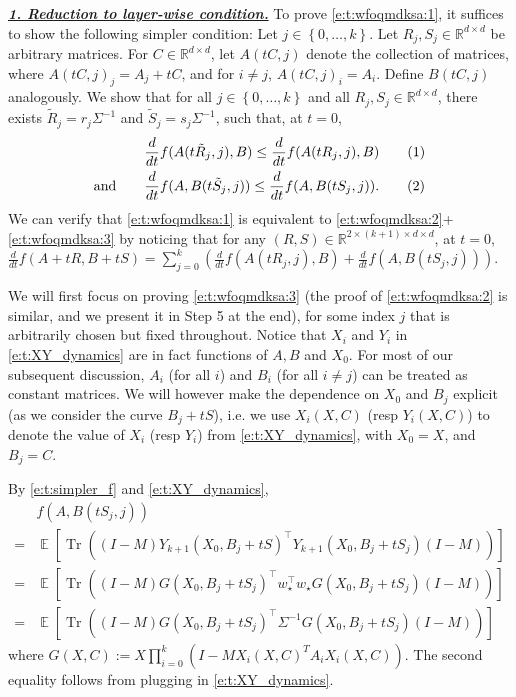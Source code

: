 \documentclass{article}
\DeclareMathOperator{\E}{\mathbb{E}}
\newcommand{\R}{\mathbb{R}}
\newcommand{\wstar}{w_\star}
\newcommand{\emphh}[1]{\textbf{\emph{#1}}}
\DeclareMathOperator{\tr}{Tr}
\newcommand*\lrb[1]{\left[ #1 \right]}
\newcommand*\lrp[1]{\left( #1 \right)}
\newcommand*\lrbb[1]{\left\{ #1 \right\}}
\newcommand\numberthis{\addtocounter{equation}{1}\tag{\theequation}}
\begin{document}
\underline{\emphh{1. Reduction to layer-wise condition.}}
To prove \eqref{e:t:wfoqmdksa:1}, it suffices to show the following simpler condition: Let $j\in \lrbb{0,\dots,k}$. Let $R_j, S_j \in \R^{d\times d}$ be arbitrary matrices. For $C\in \R^{d \times d}$, let $A(t C, j)$ denote the collection of matrices, where $A(t C, j)_j = A_j + t C$, and for $i\neq j$, $A(t C, j)_i = A_i$. Define $B(t C,j)$ analogously. We show that for all $j\in \lrbb{0,\dots,k}$ and all $R_j,S_j\in \R^{d\times d}$, there exists $\tilde{R}_j = r_j \Sigma^{-1}$ and $\tilde{S}_j = s_j \Sigma^{-1}$, such that, at $t=0$,
\begin{align*}
& \frac{d}{dt} f(A(t\tilde{R}_j, j), B) \leq \frac{d}{dt} f(A(tR_j,j), B)
\numberthis \label{e:t:wfoqmdksa:2}\\
\text{and} \qquad 
& \frac{d}{dt} f(A, B(t\tilde{S}_j,j)) \leq \frac{d}{dt} f(A, B(tS_j,j)).
\numberthis \label{e:t:wfoqmdksa:3}
\end{align*}
We can verify that \eqref{e:t:wfoqmdksa:1} is equivalent to \eqref{e:t:wfoqmdksa:2}+\eqref{e:t:wfoqmdksa:3} by noticing that for any $(R,S) \in \R^{2 \times (k+1) \times d\times d}$, at $t=0$, $\frac{d}{dt} f(A + tR, B + tS) = \sum_{j=0}^k \lrp{\frac{d}{dt} f(A(tR_j,j), B) + \frac{d}{dt} f(A, B(tS_j,j))}$. 

We will first focus on proving \eqref{e:t:wfoqmdksa:3} (the proof of \eqref{e:t:wfoqmdksa:2} is similar, and we present it in Step 5 at the end), for some index $j$ that is arbitrarily chosen but fixed throughout. Notice that $X_i$ and $Y_i$ in \eqref{e:t:XY_dynamics} are in fact functions of $A,B$ and $X_0$. For most of our subsequent discussion, $A_i$ (for all $i$) and $B_i$ (for all $i\neq j$) can be treated as constant matrices. We will however make the dependence on $X_0$ and $B_j$ explicit (as we consider the curve $B_j + t S$), i.e. we use $X_i(X, C)$ (resp $Y_i(X,C)$) to denote the value of $X_i$ (resp $Y_i$) from \eqref{e:t:XY_dynamics}, with $X_0 = X$, and $B_j = C$.

By \eqref{e:t:simpler_f} and \eqref{e:t:XY_dynamics},
\begin{align*}
& f(A, B(tS_j,j)) \\
=& \E \lrb{\tr\lrp{\lrp{I-M} Y_{k+1}(X_0, B_j+tS)^{\top} Y_{k+1}(X_0, B_j+tS_j) \lrp{I-M}}}\\
=& \E \lrb{\tr\lrp{\lrp{I-M} G(X_0, B_j + t S_j)^\top \wstar^\top \wstar G(X_0, B_j+tS_j) \lrp{I-M}}}\\
=& \E \lrb{\tr\lrp{\lrp{I-M} G(X_0, B_j + t S_j)^\top \Sigma^{-1} G(X_0, B_j + t S_j) \lrp{I-M}}}
\end{align*}
where $G(X, C) := X \prod_{i=0}^{k} \lrp{I - M X_i(X,C)^T A_i X_i(X,C)}$. The second equality follows from plugging in \eqref{e:t:XY_dynamics}. 
\end{document}

